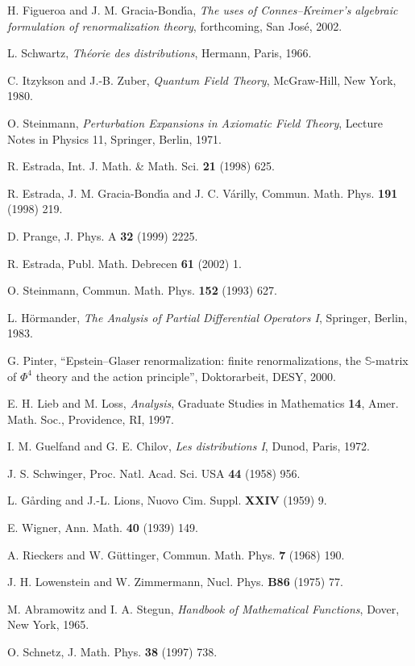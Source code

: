 \documentclass[a4paper,12pt]{article}
\newcommand{\Sf}{\mathbb{S}}       %
\newcommand{\7}{\dagger}           %
\theoremstyle{plain}
\theoremstyle{definition}
\begin{document}
\begin{thebibliography}{34}
H. Figueroa and J. M. Gracia-Bond\'{\i}a,
{\sl The uses of Connes--Kreimer's algebraic formulation of
renormalization theory}, forthcoming, San Jos\'e, 2002.

L. Schwartz,
\textit{Th\'eorie des distributions},
Hermann, Paris, 1966.

C. Itzykson and J.-B. Zuber,
\textit{Quantum Field Theory},
McGraw-Hill, New York, 1980.

O. Steinmann,
\textit{Perturbation Expansions in Axiomatic Field Theory},
Lecture Notes in Physics 11, Springer, Berlin, 1971.

R. Estrada,
Int. J. Math. \& Math. Sci. {\bf 21} (1998) 625.

R. Estrada, J. M.
Gracia-Bond\'{\i}a and J. C. V\'arilly,
Commun. Math. Phys. {\bf 191} (1998) 219.

D. Prange,
J. Phys. A {\bf 32} (1999) 2225.

R. Estrada,
Publ. Math. Debrecen {\bf 61} (2002) 1.

O. Steinmann,
Commun. Math. Phys. {\bf 152} (1993) 627.

L. H\"ormander,
\textit{The Analysis of Partial Differential Operators I},
Springer, Berlin, 1983.

G. Pinter, ``Epstein--Glaser renormalization: finite renormalizations,
the $\Sf$-matrix of $\Phi^4$ theory and the action principle'',
Doktorarbeit, DESY, 2000.

E. H. Lieb and M. Loss,
\textit{Analysis},
Graduate Studies in Mathematics {\bf 14},
Amer. Math. Soc., Providence, RI, 1997.

I. M. Guelfand and G. E. Chilov,
\textit{Les distributions I},
Dunod, Paris, 1972.

J. S. Schwinger,
Proc. Natl. Acad. Sci. USA {\bf 44} (1958) 956.

L. G{\aa}rding and J.-L. Lions,
Nuovo Cim. Suppl. {\bf XXIV} (1959) 9.

E. Wigner,
Ann. Math. {\bf 40} (1939) 149.

A. Rieckers and W. G\"uttinger,
Commun. Math. Phys. {\bf 7} (1968) 190.

J. H. Lowenstein and W. Zimmermann,
Nucl. Phys. {\bf B86} (1975) 77.

M. Abramowitz and I. A. Stegun,
\textit{Handbook of Mathematical Functions},
Dover, New York, 1965.

O. Schnetz,
J. Math. Phys. {\bf 38} (1997) 738.

\end{thebibliography}
\end{document}
